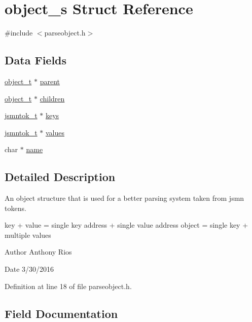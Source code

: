 \hypertarget{structobject__s}{}\section{object\+\_\+s Struct Reference}
\label{structobject__s}


{\ttfamily \#include $<$parseobject.\+h$>$}

\subsection*{Data Fields}
\begin{DoxyCompactItemize}
\item 
\hyperlink{parseobject_8h_a965db53884ff9e4e077dd5e2e2d6a5e2}{object\+\_\+t} $\ast$ \hyperlink{structobject__s_a444f5b5cbba653b103c8841fa8536b8d}{parent}
\item 
\hyperlink{parseobject_8h_a965db53884ff9e4e077dd5e2e2d6a5e2}{object\+\_\+t} $\ast$ \hyperlink{structobject__s_a2746ae4a23a7e9cd4c7d266d32c3f30f}{children}
\item 
\hyperlink{structjsmntok__t}{jsmntok\+\_\+t} $\ast$ \hyperlink{structobject__s_a720905251b014f5c9ec82e66e8463f4e}{keys}
\item 
\hyperlink{structjsmntok__t}{jsmntok\+\_\+t} $\ast$ \hyperlink{structobject__s_ab74cb2267ebadadd15e6bb59e85cc3f9}{values}
\item 
char $\ast$ \hyperlink{structobject__s_a5ac083a645d964373f022d03df4849c8}{name}
\end{DoxyCompactItemize}


\subsection{Detailed Description}
An object structure that is used for a better parsing system taken from jsmn tokens.

key + value = single key address + single value address object = single key + multiple values

\begin{DoxyAuthor}{Author}
Anthony Rios 
\end{DoxyAuthor}
\begin{DoxyDate}{Date}
3/30/2016 
\end{DoxyDate}


Definition at line 18 of file parseobject.\+h.



\subsection{Field Documentation}
